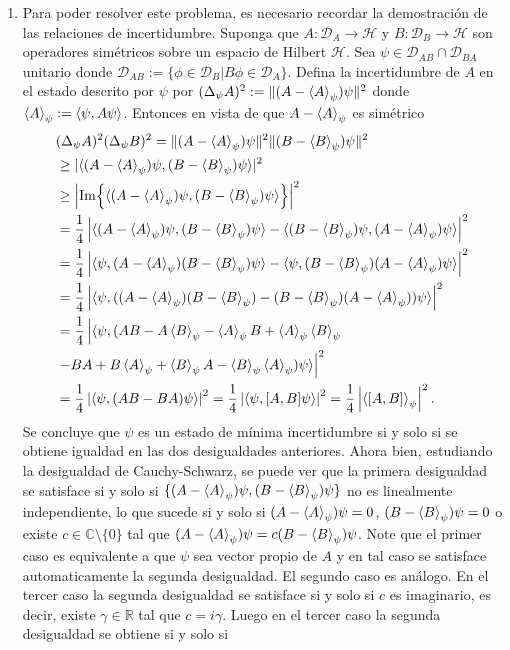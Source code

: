 \documentclass{article}
\begin{document}
\begin{enumerate}
\item Para poder resolver este problema, es necesario recordar la demostración de las relaciones de incertidumbre. Suponga que $A:\mathcal{D}_A\rightarrow\mathcal{H}$ y $B:\mathcal{D}_B\rightarrow\mathcal{H}$ son operadores simétricos sobre un espacio de Hilbert $\mathcal{H}$. Sea $\psi\in\mathcal{D}_{AB}\cap\mathcal{D}_{BA}$ unitario donde $\mathcal{D}_{AB}:=\{\phi\in\mathcal{D}_B|B\phi\in\mathcal{D}_A\}$. Defina la incertidumbre de $A$ en el estado descrito por $\psi$ por $(\Delta_\psi A)^2:=\|(A-\ev{A}_\psi)\psi\|^2$ donde $\ev{A}_\psi:=\langle\psi,A\psi\rangle$. Entonces en vista de que $A-\ev{A}_\psi$ es simétrico 
\begin{align}
\begin{split}
&(\Delta_\psi A)^2(\Delta_\psi B)^2=\|(A-\ev{A}_\psi)\psi\|^2\|(B-\ev{B}_\psi)\psi\|^2 \\
&\geq |\langle (A-\ev{A}_\psi)\psi,(B-\ev{B}_\psi)\psi\rangle|^2\\
&\geq \left\vert\Im{\langle (A-\ev{A}_\psi)\psi,(B-\ev{B}_\psi)\psi\rangle}\right\vert^2\\
&=\frac{1}{4}\left\vert \langle (A-\ev{A}_\psi)\psi,(B-\ev{B}_\psi)\psi\rangle-\langle (B-\ev{B}_\psi)\psi,(A-\ev{A}_\psi)\psi\rangle\right\vert^2\\
&=\frac{1}{4}\left\vert \langle\psi,(A-\ev{A}_\psi)(B-\ev{B}_\psi)\psi\rangle-\langle \psi,(B-\ev{B}_\psi)(A-\ev{A}_\psi)\psi\rangle\right\vert^2\\
&=\frac{1}{4}\left\vert \langle\psi,((A-\ev{A}_\psi)(B-\ev{B}_\psi)-(B-\ev{B}_\psi)(A-\ev{A}_\psi))\psi\rangle\right\vert^2\\
&=\frac{1}{4}\left\vert \langle\psi,(AB-A\ev{B}_\psi - \ev{A}_\psi B+\ev{A}_\psi\ev{B}_\psi\right.\\
&\left.-BA+B\ev{A}_\psi+\ev{B}_\psi A-\ev{B}_\psi\ev{A}_\psi)\psi\rangle\right\vert^2\\
&=\frac{1}{4}\left\vert \langle\psi,(AB-BA)\psi\rangle\right\vert^2=\frac{1}{4}\left\vert \langle\psi,[A,B]\psi\rangle\right\vert^2=\frac{1}{4}\left\vert \ev{[A,B]}_\psi\right\vert^2.
\end{split}
\end{align}
Se concluye que $\psi$ es un estado de mínima incertidumbre si y solo si se obtiene igualdad en las dos desigualdades anteriores. Ahora bien, estudiando la desigualdad de Cauchy-Schwarz, se puede ver que la primera desigualdad se satisface si y solo si $\{(A-\ev{A}_\psi)\psi,(B-\ev{B}_\psi)\psi\}$ no es linealmente independiente, lo que sucede si y solo si $(A-\ev{A}_\psi)\psi=0$, $(B-\ev{B}_\psi)\psi=0$ o existe $c\in\mathbb{C}\setminus\{0\}$ tal que $(A-\ev{A}_\psi)\psi=c(B-\ev{B}_\psi)\psi$. Note que el primer caso es equivalente a que $\psi$ sea vector propio de $A$ y en tal caso se satisface automaticamente la segunda desigualdad. El segundo caso es análogo. En el tercer caso la segunda desigualdad se satisface si y solo si $c$ es imaginario, es decir, existe $\gamma\in\mathbb{R}$ tal que $c=i\gamma$. Luego en el tercer caso la segunda desigualdad se obtiene si y solo si

\end{enumerate}
\end{document}
